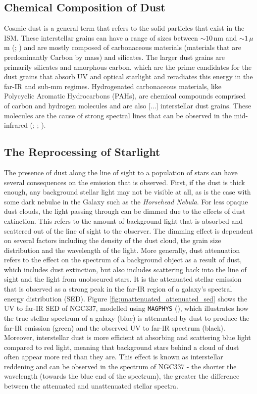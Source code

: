 \subsection{Chemical Composition of Dust}

Cosmic dust is a general term that refers to the solid particles that exist in the ISM. These interstellar grains can have a range of sizes between $\sim 10\,$nm and $\sim 1\,\mu$m (\citealt{Kim_1994}; \citealt{Galliano_2018}) and are mostly composed of carbonaceous materials (materials that are predominantly Carbon by mass) and silicates. The larger dust grains are primarily silicates and amorphous carbon, which are the prime candidates for the dust grains that absorb UV and optical starlight and reradiates this energy in the far-IR and sub-mm regimes. Hydrogenated carbonaceous materials, like Polycyclic Aromatic Hydrocarbons (PAHs), are chemical compounds comprised of carbon and hydrogen molecules and are also {\color{red}[...]} interstellar dust grains. These molecules are the cause of strong spectral lines that can be observed in the mid-infrared (\citealt{Tielens_1987}; \citealt{Draine_2007a}; \citealt{Draine_2007b}).

\subsection{The Reprocessing of Starlight}

The presence of dust along the line of sight to a population of stars can have several consequences on the emission that is observed. First, if the dust is thick enough, any background stellar light may not be visible at all, as is the case with some dark nebulae in the Galaxy such as the \textit{Horsehead Nebula}. For less opaque dust clouds, the light passing through can be dimmed due to the effects of dust extinction. This refers to the amount of background light that is absorbed and scattered out of the line of sight to the observer. The dimming effect is dependent on several factors including the density of the dust cloud, the grain size distribution and the wavelength of the light. More generally, dust attenuation refers to the effect on the spectrum of a background object as a result of dust, which includes dust extinction, but also includes scattering back into the line of sight and the light from unobscured stars. It is the attenuated stellar emission that is observed as a strong peak in the far-IR region of a galaxy's spectral energy distribution (SED). Figure \ref{fig:unattenuated_attenuated_sed} shows the UV to far-IR SED of NGC337, modelled using \texttt{MAGPHYS} (\citealt{daCunha_2008}), which illustrates how the true stellar spectrum of a galaxy (blue) is attenuated by dust to produce the far-IR emission (green) and the observed UV to far-IR spectrum (black). Moreover, interstellar dust is more efficient at absorbing and scattering blue light compared to red light, meaning that background stars behind a cloud of dust often appear more red than they are. This effect is known as interstellar reddening and can be observed in the spectrum of NGC337 - the shorter the wavelength (towards the blue end of the spectrum), the greater the difference between the attenuated and unattenuated stellar spectra.

